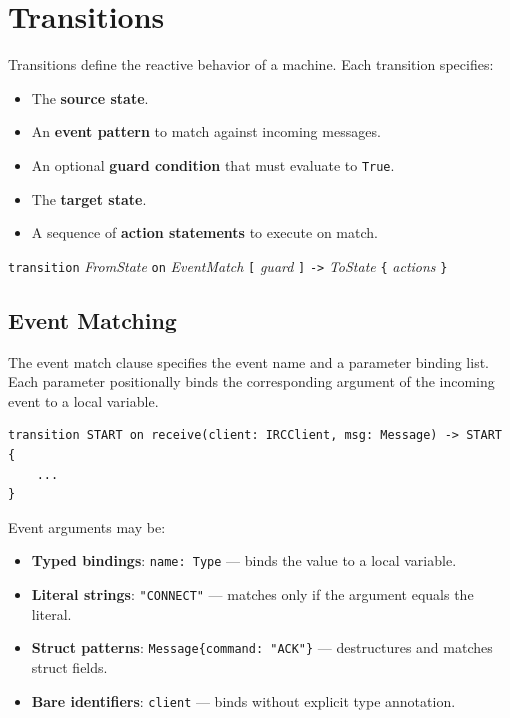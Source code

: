 \documentclass[11pt,letterpaper]{article}
\begin{document}
\section{Transitions}
\label{sec:transitions}

Transitions define the reactive behavior of a machine.  Each transition
specifies:

\begin{itemize}[leftmargin=1.5em]
  \item The \textbf{source state}.
  \item An \textbf{event pattern} to match against incoming messages.
  \item An optional \textbf{guard condition} that must evaluate to
        \texttt{True}.
  \item The \textbf{target state}.
  \item A sequence of \textbf{action statements} to execute on match.
\end{itemize}

\begin{syntaxbox}[transition]
\texttt{transition} \textit{FromState} \texttt{on}
  \textit{EventMatch} \texttt{[} \textit{guard} \texttt{]}
  \texttt{->} \textit{ToState}
  \texttt{\{} \textit{actions} \texttt{\}}
\end{syntaxbox}

\subsection{Event Matching}

The event match clause specifies the event name and a parameter binding
list.  Each parameter positionally binds the corresponding argument of
the incoming event to a local variable.

\begin{lstlisting}[numbers=none]
transition START on receive(client: IRCClient, msg: Message) -> START {
    ...
}
\end{lstlisting}

Event arguments may be:
\begin{itemize}[leftmargin=1.5em]
  \item \textbf{Typed bindings}: \texttt{name: Type} --- binds the value
        to a local variable.
  \item \textbf{Literal strings}: \texttt{"CONNECT"} --- matches only
        if the argument equals the literal.
  \item \textbf{Struct patterns}: \texttt{Message\{command: "ACK"\}}
        --- destructures and matches struct fields.
  \item \textbf{Bare identifiers}: \texttt{client} --- binds without
        explicit type annotation.
\end{itemize}
\end{document}
